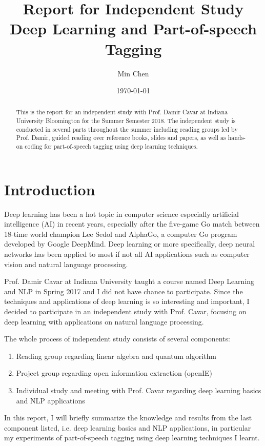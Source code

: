 \documentclass[11pt]{article}
\theoremstyle{plain}
\begin{document}
\title{Report for Independent Study\\
Deep Learning and Part-of-speech Tagging}
\author{Min Chen}
\date{\today}
\maketitle
\thispagestyle{fancy}

\begin{abstract}
	
This is the report for an independent study with Prof. Damir Cavar at Indiana 
University Bloomington for the Summer Semester 2018. The independent 
study is conducted in several parts throughout the summer including reading 
groups led by Prof. Damir, guided reading over reference books, slides and 
papers, as well as hands-on coding for part-of-speech tagging using deep 
learning techniques. 

\end{abstract}
\pagebreak
\tableofcontents
\pagebreak


\section{Introduction}

Deep learning has been a hot topic in computer science especially artificial 
intelligence (AI) in recent years, especially after the five-game Go match 
between 18-time world champion Lee Sedol and AlphaGo, a computer Go 
program developed by Google DeepMind. Deep learning or more specifically, 
deep neural networks has been applied to most if not all AI applications such 
as computer vision and natural language processing. 

Prof. Damir Cavar at Indiana University taught a course named Deep Learning 
and NLP in Spring 2017 and I did not have chance to participate. Since the 
techniques and applications of deep learning is so interesting and important, 
I decided to participate in an independent study with Prof. Cavar, focusing on 
deep learning with applications on natural language processing. 

The whole process of independent study consists of several components: 
\begin{enumerate}
	\item Reading group regarding linear algebra and quantum algorithm
	\item Project group regarding open information extraction (openIE) 
	\item Individual study and meeting with Prof. Cavar regarding deep learning 
	basics and NLP applications
\end{enumerate}
In this report, I will briefly summarize the knowledge and results from the last 
component listed, i.e. deep learning basics and NLP applications, in particular 
my experiments of part-of-speech tagging using deep learning techniques I 
learnt. 
\end{document}
